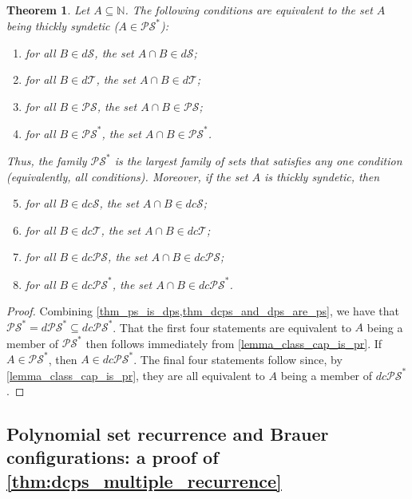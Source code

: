 \documentclass[letter,11pt]{article}
\theoremstyle{plain}
\newtheorem{theorem}{Theorem}
\theoremstyle{definition}
\theoremstyle{plain}
\theoremstyle{plain}
\numberwithin{equation}{section}
\newcommand{\N}{\mathbb{N}}
\newcommand{\dsyndetic}{d\mathcal{S}}
\newcommand{\dthick}{d\mathcal{T}}
\newcommand{\dcsyndetic}{dc\mathcal{S}}
\newcommand{\dcthick}{dc\mathcal{T}}
\newcommand{\PS}{\mathcal{PS}}
\newcommand{\dPS}{d\mathcal{PS}}
\newcommand{\dcPS}{dc\mathcal{PS}}
\begin{document}
\begin{theorem}
\label{cor:largest_family_satisfies_cap}
    Let $A \subseteq \N$.  The following conditions are equivalent to the set $A$ being thickly syndetic ($A \in \PS^*$):
    \begin{enumerate}
        \item
        for all $B \in \dsyndetic$, the set $A \cap B \in \dsyndetic$;

        \item
        for all $B \in \dthick$, the set $A \cap B \in \dthick$;

        \item
        for all $B \in \PS$, the set $A \cap B \in \PS$;

        \item for all $B \in \PS^*$, the set $A \cap B \in \PS^*$.
    \end{enumerate}
    Thus, the family $\PS^*$ is the largest family of sets that satisfies any one condition (equivalently, all conditions).  Moreover, if the set $A$ is thickly syndetic, then
    \begin{enumerate}
    \setcounter{enumi}{4}
        \item
        for all $B \in \dcsyndetic$, the set $A \cap B \in \dcsyndetic$;

        \item
        for all $B \in \dcthick$, the set $A \cap B \in \dcthick$;

        \item
        for all $B \in \dcPS$, the set $A \cap B \in \dcPS$;

        \item for all $B \in \dcPS^*$, the set $A \cap B \in \dcPS^*$.
    \end{enumerate}
\end{theorem}
\begin{proof}
    Combining \cref{thm_ps_is_dps,thm_dcps_and_dps_are_ps}, we have that $\PS^* = \dPS^* \subseteq \dcPS^*$.  That the first four statements are equivalent to $A$ being a member of $\PS^*$ then follows immediately from \cref{lemma_class_cap_is_pr}.  If $A \in \PS^*$, then $A \in \dcPS^*$.  The final four statements follow since, by \cref{lemma_class_cap_is_pr}, they are all equivalent to $A$ being a member of $\dcPS^*$.
\end{proof}



\subsection{Polynomial set recurrence and Brauer configurations: a proof of \texorpdfstring{\cref{thm:dcps_multiple_recurrence}}{Theorem H}}
\label{sec_dcps_and_set_recurrence}
\end{document}
